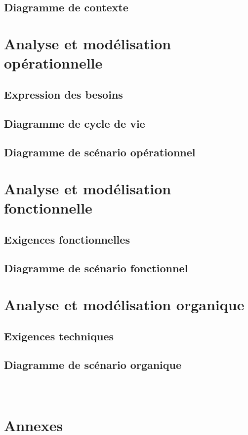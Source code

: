 \documentclass{article}
\begin{document}
\subsection{Diagramme de contexte} 



\section{Analyse et modélisation opérationnelle}
\subsection{Expression des besoins}
\subsection{Diagramme de cycle de vie}

\subsection{Diagramme de scénario opérationnel}


\section{Analyse et modélisation fonctionnelle}



\subsection{Exigences fonctionnelles}

\clearpage


\subsection{Diagramme de scénario fonctionnel}

\clearpage


\subsection{}

\clearpage


\section{Analyse et modélisation organique}



\subsection{Exigences techniques}

\clearpage


\subsection{Diagramme de scénario organique}

\clearpage


\subsection{}

\clearpage


\

\section{Annexes}
\end{document}

